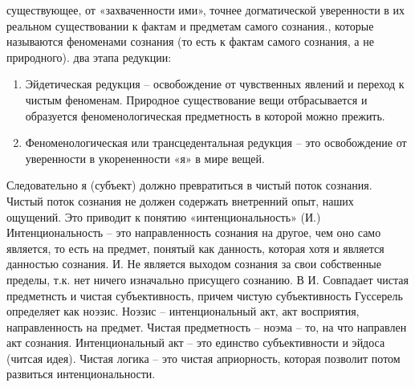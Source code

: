 \documentclass[12pt]{article}
\begin{document}
существующее, от «захваченности ими», точнее догматической уверенности в их реальном существовании к
фактам и предметам самого сознания., которые называются феноменами сознания (то есть к фактам самого
сознания, а не природного).
два этапа редукции:
\begin{enumerate}
  \item Эйдетическая редукция – освобождение от чувственных явлений и переход к чистым феноменам. Природное
существование вещи отбрасывается и образуется феноменологическая предметность в которой можно прежить.
\item Феноменологическая или трансцедентальная редукция – это освобождение от уверенности в укорененности
«я» в мире вещей.
\end{enumerate}
Следовательно я (субъект) должно превратиться в чистый поток сознания.
Чистый поток сознания не должен содержать внетренний опыт, наших ощущений.
Это приводит к понятию «интенциональность» (И.)
Интенциональность – это направленность сознания на другое, чем оно само является, то есть на предмет,
понятый как данность, которая хотя и является данностью сознания. И. Не является выходом сознания за свои
собственные пределы, т.к. нет ничего изначально присущего сознанию. В И. Совпадает чистая предметнсть и
чистая субъективность, причем чистую субъективность Гуссерель определяет как ноэзис.
Ноэзис – интенциональный акт, акт восприятия, направленность на предмет.
Чистая предметность – ноэма – то, на что направлен акт сознания.
Интенциональный акт – это единство субъективности и эйдоса (читсая идея).
Чистая логика – это чистая априорность, которая позволит потом развиться интенциональности.

\newpage
\end{document}
